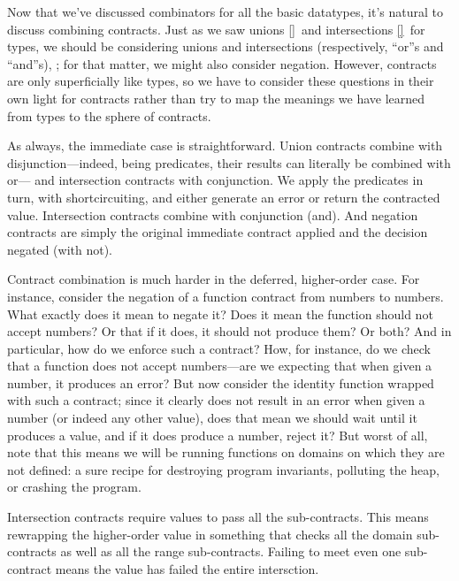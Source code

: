 
Now that we’ve discussed combinators for all the basic datatypes, it’s natural
to discuss combining contracts. Just as we saw unions \ref{}\ and intersections
\ref{}\ for types, we should be considering unions and intersections
(respectively, “or”s and “and”s), ; for that matter, we might also consider
negation. However, contracts are only superficially like types, so we have to
consider these questions in their own light for contracts rather than try to map
the meanings we have learned from types to the sphere of contracts.

As always, the immediate case is straightforward. Union contracts combine with
disjunction—indeed, being predicates, their results can literally be combined
with or— and intersection contracts with conjunction. We apply the predicates in
turn, with shortcircuiting, and either generate an error or return the
contracted value. Intersection contracts combine with conjunction (and). And
negation contracts are simply the original immediate contract applied and the
decision negated (with not).

Contract combination is much harder in the deferred, higher-order case. For
instance, consider the negation of a function contract from numbers to numbers.
What exactly does it mean to negate it? Does it mean the function should not
accept numbers? Or that if it does, it should not produce them? Or both? And in
particular, how do we enforce such a contract? How, for instance, do we check
that a function does not accept numbers—are we expecting that when given a
number, it produces an error? But now consider the identity function wrapped
with such a contract; since it clearly does not result in an error when given a
number (or indeed any other value), does that mean we should wait until it
produces a value, and if it does produce a number, reject it? But worst of all,
note that this means we will be running functions on domains on which they are
not defined: a sure recipe for destroying program invariants, polluting the
heap, or crashing the program.

Intersection contracts require values to pass all the sub-contracts. This means
rewrapping the higher-order value in something that checks all the domain
sub-contracts as well as all the range sub-contracts. Failing to meet even one
sub-contract means the value has failed the entire intersction.

